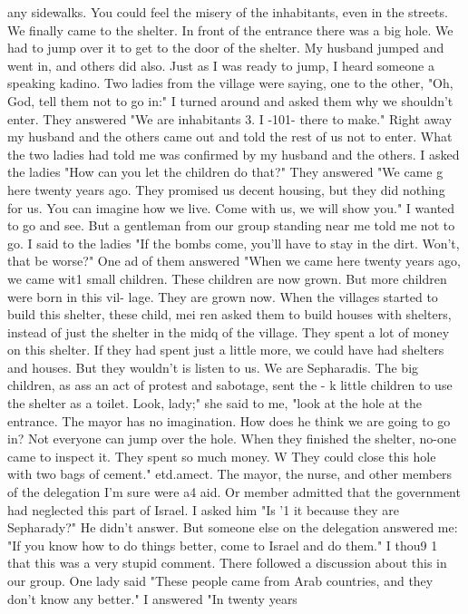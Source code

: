 {{any sidewalks. You could feel the misery of the inhabitants, even in the streets. 
We finally came to the shelter. In front of the entrance there was a big hole. We 
had to jump over it to get to the door of the shelter. My husband jumped and went in, and 
others did also. Just as I was ready to jump, I heard someone a speaking kadino. Two 
ladies from the village were saying, one to the other, "Oh, God, tell them not to go in:" 
I turned around and asked them why we shouldn't enter. They answered "We are inhabitants 
3. 
I 
-101- 
there to make." Right away my husband and the others came out and told the rest of us not 
to enter. What the two ladies had told me was confirmed by my husband and the others. I 
asked the ladies "How can you let the children do that?" They answered "We came g here 
twenty years ago. They promised us decent housing, but they did nothing for us. You can 
imagine how we live. Come with us, we will show you." 
I wanted to go and see. But a gentleman from our group standing near me told me not 
to go. I said to the ladies "If the bombs come, you'll have to stay in the dirt. Won't, 
that be worse?" One ad of them answered "When we came here twenty years ago, we came wit1 
small children. These children are now grown. But more children were born in this vil-
lage. They are grown now. When the villages started to build this shelter, these child, 
mei ren asked them to build houses with shelters, instead of just the shelter in the midq 
of the village. They spent a lot of money on this shelter. If they had spent just a 
little more, we could have had shelters and houses. But they wouldn't is listen to us. 
We are Sepharadis. The big children, as ass an act of protest and sabotage, sent the - 
k little children to use the shelter as a toilet. Look, lady;" she said to me, "look at 
the hole at the entrance. The mayor has no imagination. How does he think we are going 
to go in? Not everyone can jump over the hole. When they finished the shelter, no-one 
came to inspect it. They spent so much money. W They could close this hole with two 
bags of cement." 
etd.amect. 
The mayor, the nurse, and other members of the delegation I'm sure were a4 aid. Or 
member admitted that the government had neglected this part of Israel. I asked him "Is '1 
it because they are Sepharady?" He didn't answer. But someone else on the delegation 
answered me: "If you know how to do things better, come to Israel and do them." I thou9 1 
that this was a very stupid comment. 
There followed a discussion about this in our group. One lady said "These people 
came from Arab countries, and they don't know any better." I answered "In twenty years 
}}
